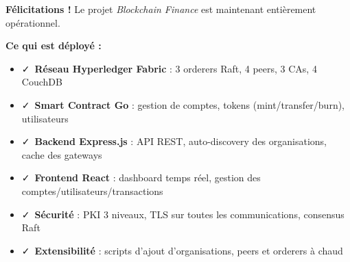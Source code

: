 \documentclass[12pt,a4paper,twoside]{report}
\begin{document}
\begin{successbox}
\textbf{Félicitations !} Le projet \textit{Blockchain Finance} est maintenant entièrement opérationnel.

\textbf{Ce qui est déployé :}
\begin{itemize}
    \item \faCheck\ \textbf{Réseau Hyperledger Fabric} : 3 orderers Raft, 4 peers, 3 CAs, 4 CouchDB
    \item \faCheck\ \textbf{Smart Contract Go} : gestion de comptes, tokens (mint/transfer/burn), utilisateurs
    \item \faCheck\ \textbf{Backend Express.js} : API REST, auto-discovery des organisations, cache des gateways
    \item \faCheck\ \textbf{Frontend React} : dashboard temps réel, gestion des comptes/utilisateurs/transactions
    \item \faCheck\ \textbf{Sécurité} : PKI 3 niveaux, TLS sur toutes les communications, consensus Raft
    \item \faCheck\ \textbf{Extensibilité} : scripts d'ajout d'organisations, peers et orderers à chaud
\end{itemize}
\end{successbox}

\vspace{1cm}

\begin{center}
\end{center}
\end{document}
